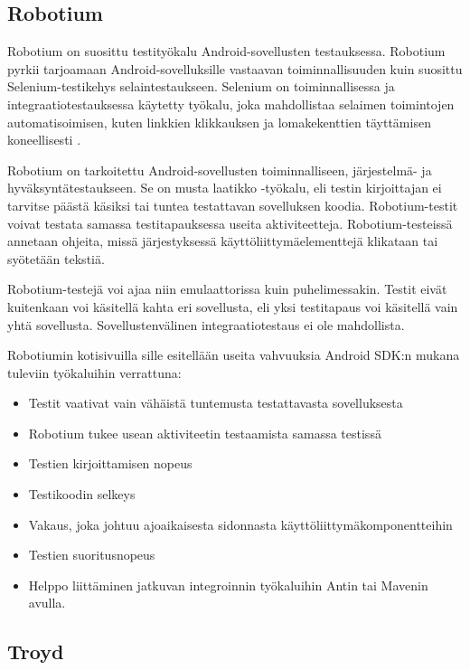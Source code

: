 \subsection{Robotium}

Robotium \cite{robotium} on suosittu testityökalu Android-sovellusten testauksessa. Robotium pyrkii tarjoamaan Android-sovelluksille vastaavan toiminnallisuuden kuin suosittu Selenium-testikehys selaintestaukseen. Selenium on toiminnallisessa ja integraatiotestauksessa käytetty työkalu, joka mahdollistaa selaimen toimintojen automatisoimisen, kuten linkkien klikkauksen ja lomakekenttien täyttämisen koneellisesti \cite{selenium}.

Robotium on tarkoitettu Android-sovellusten toiminnalliseen, järjestelmä- ja hyväksyntätestaukseen. Se on musta laatikko -työkalu, eli testin kirjoittajan ei tarvitse päästä käsiksi tai tuntea testattavan sovelluksen koodia. Robotium-testit voivat testata samassa testitapauksessa useita aktiviteetteja. Robotium-testeissä annetaan ohjeita, missä järjestyksessä käyttöliittymäelementtejä klikataan tai syötetään tekstiä.

Robotium-testejä voi ajaa niin emulaattorissa kuin puhelimessakin. Testit eivät kuitenkaan voi käsitellä kahta eri sovellusta, eli yksi testitapaus voi käsitellä vain yhtä sovellusta. Sovellustenvälinen integraatiotestaus ei ole mahdollista.

Robotiumin kotisivuilla sille esitellään useita vahvuuksia Android SDK:n mukana tuleviin työkaluihin verrattuna: 
\begin{itemize}
  \itemsep0em
  \item Testit vaativat vain vähäistä tuntemusta testattavasta sovelluksesta 
  \item Robotium tukee usean aktiviteetin testaamista samassa testissä
  \item Testien kirjoittamisen nopeus 
  \item Testikoodin selkeys
  \item Vakaus, joka johtuu ajoaikaisesta sidonnasta käyttöliittymäkomponentteihin
  \item Testien suoritusnopeus 
  \item Helppo liittäminen jatkuvan integroinnin työkaluihin Antin tai Mavenin avulla.
\end{itemize}

\subsection{Troyd}

